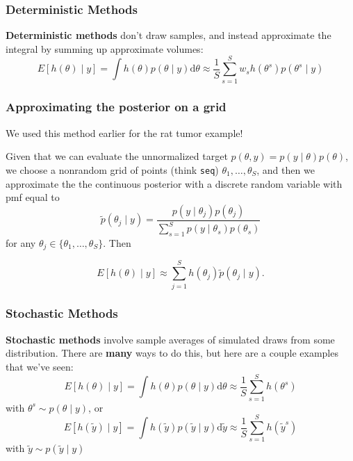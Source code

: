 \documentclass{beamer}
\begin{document}
\begin{frame}
\frametitle{Deterministic Methods}

{\bf Deterministic methods} don't draw samples, and instead approximate the integral by summing up approximate volumes:
\[
E[h(\theta) \mid y] = \int h(\theta) p(\theta \mid y) \text{d}\theta \approx \frac{1}{S} \sum_{s=1}^S w_s h(\theta^s)p(\theta^s \mid y)
\]

\end{frame}
\begin{frame}[fragile]
\frametitle{Approximating the posterior on a grid}

We used this method earlier for the rat tumor example!
\newline

Given that we can evaluate the unnormalized target $p(\theta, y) = p(y \mid \theta)p(\theta)$, we choose a nonrandom grid of points (think \verb|seq|) $\theta_1, \ldots, \theta_S$, and then we approximate the the continuous posterior with a discrete random variable with pmf equal to
\[
\tilde{p}(\theta_j \mid y) = \frac{p(y \mid \theta_j)p(\theta_j)}{\sum_{s=1}^S p(y \mid \theta_s)p(\theta_s) }
\]
for any $\theta_j \in \{\theta_1, \ldots, \theta_S\}$. Then
\newline

$$
E[h(\theta) \mid y] \approx \sum_{j=1}^S h(\theta_j)\tilde{p}(\theta_j \mid y) .
$$

\end{frame}
\begin{frame}
\frametitle{Stochastic Methods}

{\bf Stochastic methods} involve sample averages of simulated draws from some distribution. There are {\bf many} ways to do this, but here are a couple examples that we've seen:
\[
E[h(\theta) \mid y] = \int h(\theta) p(\theta \mid y) \text{d}\theta \approx \frac{1}{S} \sum_{s=1}^S h(\theta^s)
\]
with $\theta^s \sim p(\theta \mid y)$, or
\[
E[h(\tilde{y}) \mid y] = \int h(\tilde{y}) p(\tilde{y} \mid y) \text{d} \tilde{y} \approx \frac{1}{S} \sum_{s=1}^S h(\tilde{y}^s)
\]
with $\tilde{y} \sim p(\tilde{y} \mid y)$

\end{frame}
\end{document}
